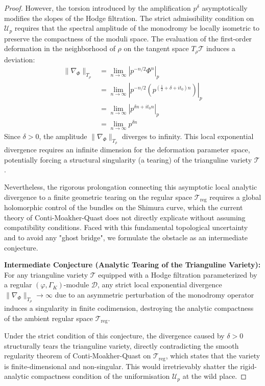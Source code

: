 \documentclass[
]{article}
\begin{document}
\begin{proof}
However, the torsion introduced by the amplification $p^{\delta}$ asymptotically modifies the slopes of the Hodge filtration. The strict admissibility condition on $\mathcal{U}_p$ requires that the spectral amplitude of the monodromy be locally isometric to preserve the compactness of the moduli space. The evaluation of the first-order deformation in the neighborhood of $\rho$ on the tangent space $T_{\rho} \mathcal{T}$ induces a deviation:
\begin{align*}
    \| \nabla_{\Phi} \|_{T_{\rho}} &= \lim_{n \to \infty} \left| p^{-n/2} \Phi^n \right|_p \\
    &= \lim_{n \to \infty} \left| p^{-n/2} \left( p^{(\frac{1}{2} + \delta + it_0)n} \right) \right|_p \\
    &= \lim_{n \to \infty} \left| p^{\delta n + it_0 n} \right|_p \\
    &= \lim_{n \to \infty} p^{\delta n}
\end{align*}
Since $\delta > 0$, the amplitude $\| \nabla_{\Phi} \|_{T_{\rho}}$ diverges to infinity. This local exponential divergence requires an infinite dimension for the deformation parameter space, potentially forcing a structural singularity (a tearing) of the trianguline variety $\mathcal{T}$.

Nevertheless, the rigorous prolongation connecting this asymptotic local analytic divergence to a finite geometric tearing on the regular space $\mathcal{T}_{\text{reg}}$ requires a global holomorphic control of the bundles on the Shimura curve, which the current theory of Conti-Moakher-Quast does not directly explicate without assuming compatibility conditions. Faced with this fundamental topological uncertainty and to avoid any "ghost bridge", we formulate the obstacle as an intermediate conjecture.

\textbf{Intermediate Conjecture (Analytic Tearing of the Trianguline Variety):} For any trianguline variety $\mathcal{T}$ equipped with a Hodge filtration parameterized by a regular $(\varphi,\Gamma_K)$-module $\mathcal{D}$, any strict local exponential divergence $\| \nabla_{\Phi} \|_{T_{\rho}} \to \infty$ due to an asymmetric perturbation of the monodromy operator induces a singularity in finite codimension, destroying the analytic compactness of the ambient regular space $\mathcal{T}_{\text{reg}}$.

Under the strict condition of this conjecture, the divergence caused by $\delta > 0$ structurally tears the trianguline variety, directly contradicting the smooth regularity theorem of Conti-Moakher-Quast on $\mathcal{T}_{\text{reg}}$, which states that the variety is finite-dimensional and non-singular. This would irretrievably shatter the rigid-analytic compactness condition of the uniformisation $\mathcal{U}_p$ at the wild place.


\end{proof}
\end{document}
